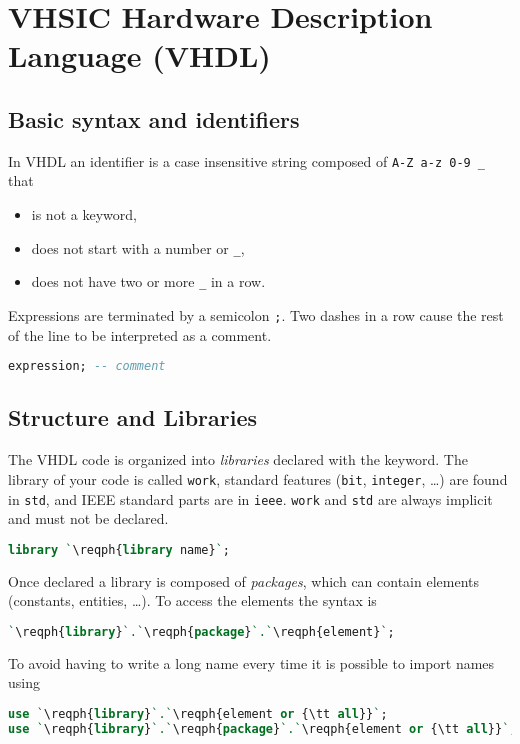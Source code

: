 \section[VHSIC Hardware Description Language (VHDL)]{
  VHSIC Hardware Description Language (VHDL)
}

\subsection{Basic syntax and identifiers}
In VHDL an identifier is a case insensitive string composed of
\texttt{A-Z a-z 0-9 \_} that
\begin{itemize}
  \item is not a keyword,
  \item does not start with a number or \texttt{\_},
  \item does not have two or more \texttt{\_} in a row.
\end{itemize}
Expressions are terminated by a semicolon \texttt{;}.
Two dashes in a row cause the rest of the line to be interpreted as a comment.
\begin{lstlisting}[language=vhdl]
expression; -- comment
\end{lstlisting}

\subsection{Structure and Libraries}
The VHDL code is organized into \emph{libraries} declared with the
 keyword. The library of your code is called \texttt{work},
standard features (\texttt{bit}, \texttt{integer}, \ldots) are found in
\texttt{std}, and IEEE standard parts are in \texttt{ieee}. \texttt{work} and
\texttt{std} are always implicit and must not be declared.
\begin{lstlisting}[language=vhdl]
library `\reqph{library name}`;
\end{lstlisting}
Once declared a library is composed of \emph{packages}, which can contain
elements (constants, entities, \ldots). To access the elements the syntax is 
\begin{lstlisting}[language=vhdl]
`\reqph{library}`.`\reqph{package}`.`\reqph{element}`;
\end{lstlisting}
To avoid having to write a long name every time it is possible to import names
using
\begin{lstlisting}[language=vhdl]
use `\reqph{library}`.`\reqph{element or {\tt all}}`;
use `\reqph{library}`.`\reqph{package}`.`\reqph{element or {\tt all}}`;
\end{lstlisting}


